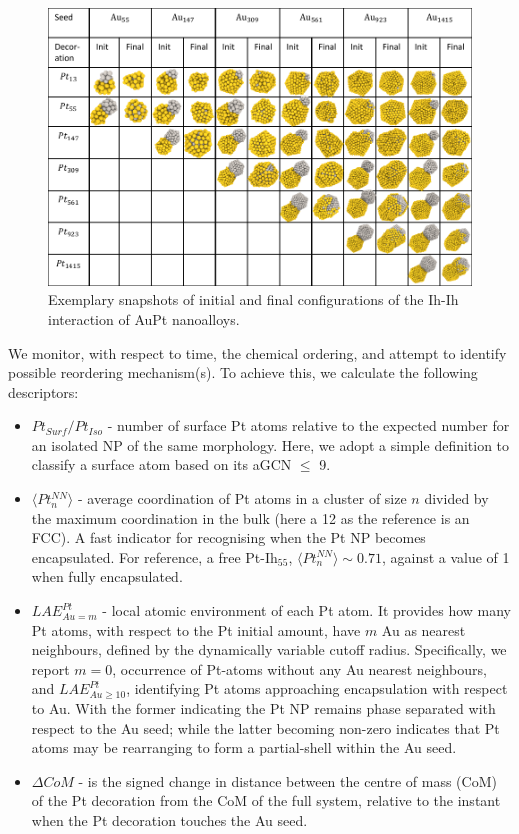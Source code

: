 %
\begin{figure}
    \centering
    \includegraphics[width=\textwidth]{figures/MD/Coal/Ih_Struts.pdf}
    \caption{Exemplary snapshots of initial and final configurations of the Ih-Ih interaction of AuPt nanoalloys.}
    \label{fig:Ptload_Struts}
\end{figure}

We monitor, with respect to time, the chemical ordering, and attempt to identify possible reordering mechanism(s). To achieve this, we calculate the following descriptors:
\begin{itemize}
    \item $Pt_{Surf} / Pt_{Iso}$ - number of surface Pt atoms relative to the expected number for an isolated NP of the same morphology. Here, we adopt a simple definition to classify a surface atom based on its aGCN $\leq$ 9.
    \item $\langle Pt^{NN}_{n} \rangle$ - average coordination of Pt atoms in a cluster of size $n$ divided by the maximum coordination in the bulk (here a 12 as the reference is an FCC). A fast indicator for recognising when the Pt NP becomes encapsulated. For reference, a free Pt-Ih$_{55}$,  $\langle Pt^{NN}_{n} \rangle \sim 0.71$, against a value of 1 when fully encapsulated.
    \item $LAE^{Pt}_{Au = m}$ - local atomic environment of each Pt atom. It provides how many Pt atoms, with respect to the Pt initial amount, have $m$ Au as nearest neighbours, defined by the dynamically variable cutoff radius. Specifically, we report $m=0$, occurrence of Pt-atoms without any Au nearest neighbours, and $LAE^{Pt}_{Au \geq 10}$, identifying Pt atoms approaching encapsulation with respect to Au. With the former indicating the Pt NP remains phase separated with respect to the Au seed; while the latter becoming non-zero indicates that Pt atoms may be rearranging to form a partial-shell within the Au seed\cite{Hong2019}.
    \item $\Delta CoM$ - is the signed change in distance between the centre of mass (CoM) of the Pt decoration from the CoM of the full system, relative to the instant when the Pt decoration touches the Au seed.
    
\end{itemize}


